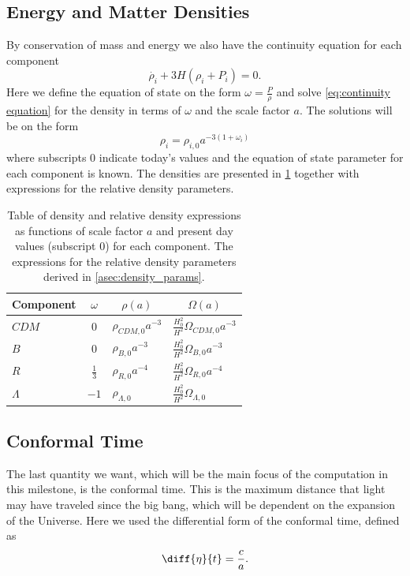 \documentclass[10pt,a4paper]{article}
\begin{document}
\subsection{Energy and Matter Densities}
\label{subsec:Theory/densities}
By conservation of mass and energy we also have the continuity equation for each component
%
\begin{equation}
    \dot{\rho_i} + 3H \left(\rho_i + P_i \right) = 0.
    \label{eq:continuity equation}
\end{equation}
%
Here we define the equation of state on the form $\omega = \frac{P}{\rho}$ and solve \cref{eq:continuity equation} for the density in terms of $\omega$ and the scale factor $a$. The solutions will be on the form
%
\begin{equation}
    \rho_i = \rho_{i,0} a^{-3(1+\omega_i)}
    \label{eq:rho_i(a,w)}
\end{equation}
%
where subscripts $0$ indicate today's values and the equation of state parameter for each component is known. The densities are presented in \cref{tab:densities} together with expressions for the relative density parameters.
%
\begin{table}[h]
    \centering
    \begin{tabular}{|l|c|l|l|}
    \hline
    Component & $\omega$      & \multicolumn{1}{c|}{$\rho(a)$} & \multicolumn{1}{c|}{$\Omega(a)$}        \\[3pt] \hline
    $CDM$     & $0$           & $\rho_{CDM,0}a^{-3}$           & $\frac{H_0^2}{H^2}\Omega_{CDM,0}a^{-3}$ \\[3pt] \hline
    $B$       & $0$           & $\rho_{B,0}a^{-3}$             & $\frac{H_0^2}{H^2}\Omega_{B,0}a^{-3}$   \\[3pt] \hline
    $R$       & $\frac{1}{3}$ & $\rho_{R,0}a^{-4}$             & $\frac{H_0^2}{H^2}\Omega_{R,0}a^{-4}$   \\[3pt] \hline
    $\Lambda$ & $-1$          & $\rho_{\Lambda,0}$             & $\frac{H_0^2}{H^2}\Omega_{\Lambda,0}$   \\[3pt] \hline
    \end{tabular}
    \caption{Table of density and relative density expressions as functions of scale factor $a$ and present day values (subscript $0$) for each component. The expressions for the relative density parameters derived in \cref{asec:density_params}.}
    \label{tab:densities}
\end{table}
%
\subsection{Conformal Time}
\label{subsce:Theory/Conformal Time}
The last quantity we want, which will be the main focus of the computation in this milestone, is the conformal time. This is the maximum distance that light may have traveled since the big bang, which will be dependent on the expansion of the Universe. Here we used the differential form of the conformal time, defined as 
%
\begin{equation}
    \diff{\eta}{t} = \frac{c}{a}.
    \label{eq:eta_diff}
\end{equation}
%
\end{document}
